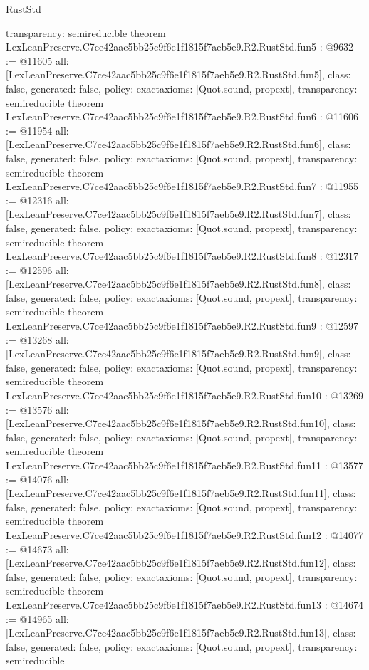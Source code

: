 \begin{lexlean}{RustStd}
\begin{coremodule}
{  transparency: semireducible
}
theorem LexLeanPreserve.C7ce42aac5bb25c9f6e1f1815f7aeb5e9.R2.RustStd.fun5 : @9632 := @11605 {
  all: [LexLeanPreserve.C7ce42aac5bb25c9f6e1f1815f7aeb5e9.R2.RustStd.fun5],
  class: false,
  generated: false,
  policy: exact{axioms: [Quot.sound, propext]},
  transparency: semireducible
}
theorem LexLeanPreserve.C7ce42aac5bb25c9f6e1f1815f7aeb5e9.R2.RustStd.fun6 : @11606 := @11954 {
  all: [LexLeanPreserve.C7ce42aac5bb25c9f6e1f1815f7aeb5e9.R2.RustStd.fun6],
  class: false,
  generated: false,
  policy: exact{axioms: [Quot.sound, propext]},
  transparency: semireducible
}
theorem LexLeanPreserve.C7ce42aac5bb25c9f6e1f1815f7aeb5e9.R2.RustStd.fun7 : @11955 := @12316 {
  all: [LexLeanPreserve.C7ce42aac5bb25c9f6e1f1815f7aeb5e9.R2.RustStd.fun7],
  class: false,
  generated: false,
  policy: exact{axioms: [Quot.sound, propext]},
  transparency: semireducible
}
theorem LexLeanPreserve.C7ce42aac5bb25c9f6e1f1815f7aeb5e9.R2.RustStd.fun8 : @12317 := @12596 {
  all: [LexLeanPreserve.C7ce42aac5bb25c9f6e1f1815f7aeb5e9.R2.RustStd.fun8],
  class: false,
  generated: false,
  policy: exact{axioms: [Quot.sound, propext]},
  transparency: semireducible
}
theorem LexLeanPreserve.C7ce42aac5bb25c9f6e1f1815f7aeb5e9.R2.RustStd.fun9 : @12597 := @13268 {
  all: [LexLeanPreserve.C7ce42aac5bb25c9f6e1f1815f7aeb5e9.R2.RustStd.fun9],
  class: false,
  generated: false,
  policy: exact{axioms: [Quot.sound, propext]},
  transparency: semireducible
}
theorem LexLeanPreserve.C7ce42aac5bb25c9f6e1f1815f7aeb5e9.R2.RustStd.fun10 : @13269 := @13576 {
  all: [LexLeanPreserve.C7ce42aac5bb25c9f6e1f1815f7aeb5e9.R2.RustStd.fun10],
  class: false,
  generated: false,
  policy: exact{axioms: [Quot.sound, propext]},
  transparency: semireducible
}
theorem LexLeanPreserve.C7ce42aac5bb25c9f6e1f1815f7aeb5e9.R2.RustStd.fun11 : @13577 := @14076 {
  all: [LexLeanPreserve.C7ce42aac5bb25c9f6e1f1815f7aeb5e9.R2.RustStd.fun11],
  class: false,
  generated: false,
  policy: exact{axioms: [Quot.sound, propext]},
  transparency: semireducible
}
theorem LexLeanPreserve.C7ce42aac5bb25c9f6e1f1815f7aeb5e9.R2.RustStd.fun12 : @14077 := @14673 {
  all: [LexLeanPreserve.C7ce42aac5bb25c9f6e1f1815f7aeb5e9.R2.RustStd.fun12],
  class: false,
  generated: false,
  policy: exact{axioms: [Quot.sound, propext]},
  transparency: semireducible
}
theorem LexLeanPreserve.C7ce42aac5bb25c9f6e1f1815f7aeb5e9.R2.RustStd.fun13 : @14674 := @14965 {
  all: [LexLeanPreserve.C7ce42aac5bb25c9f6e1f1815f7aeb5e9.R2.RustStd.fun13],
  class: false,
  generated: false,
  policy: exact{axioms: [Quot.sound, propext]},
  transparency: semireducible
}
\end{coremodule}
\end{lexlean}
